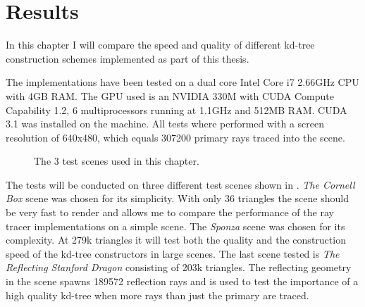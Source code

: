 
\chapter{Results}\label{chp:results}



In this chapter I will compare the speed and quality of different kd-tree
construction schemes implemented as part of this thesis.


The implementations have been tested on a dual core Intel Core i7 2.66GHz CPU
with 4GB RAM. The GPU used is an NVIDIA 330M with CUDA Compute Capability 1.2, 6
multiprocessors running at 1.1GHz and 512MB RAM. CUDA 3.1 was installed on the
machine. All tests where performed with a screen resolution of 640x480, which
equals 307200 primary rays traced into the scene.

\begin{figure}
  \centering
  \caption[Test scenes.]{The 3 test scenes used in this chapter.}
  \label{fig:testScenes}
\end{figure}


The tests will be conducted on three different test scenes shown in
. \textit{The Cornell Box} scene was chosen for its
simplicity. With only 36 triangles the scene should be very fast to render and
allows me to compare the performance of the ray tracer implementations on a
simple scene. The \textit{Sponza} scene was chosen for its complexity. At 279k
triangles it will test both the quality and the construction speed of the
kd-tree constructors in large scenes. The last scene tested is \textit{The
  Reflecting Stanford Dragon} consisting of 203k triangles. The reflecting
geometry in the scene spawns 189572 reflection rays and is used to test
the importance of a high quality kd-tree when more rays than just the primary
are traced.

